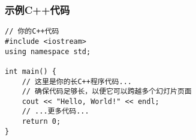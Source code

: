 \documentclass{beamer}
\begin{document}
\begin{frame}
\frametitle{示例C++代码}

\begin{verbatim}
// 你的C++代码
#include <iostream>
using namespace std;

int main() {
    // 这里是你的长C++程序代码...
    // 确保代码足够长，以便它可以跨越多个幻灯片页面
    cout << "Hello, World!" << endl;
    // ...更多代码...
    return 0;
}
\end{verbatim}

\end{frame}
\end{document}
